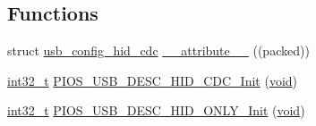 \subsection*{Functions}
\begin{DoxyCompactItemize}
\item 
struct \hyperlink{structusb__config__hid__cdc}{usb\-\_\-config\-\_\-hid\-\_\-cdc} \hyperlink{group___p_i_o_s___u_s_b___d_e_s_c_ga6fb0c6d6cc5e1170eef958ceaf306a50}{\-\_\-\-\_\-attribute\-\_\-\-\_\-} ((packed))
\item 
\hyperlink{group___n_a_m_e_gafd12020da5a235dfcf0c3c748fb5baed}{int32\-\_\-t} \hyperlink{group___p_i_o_s___u_s_b___d_e_s_c_ga15a9a7a662d2bce8263b132b33753d75}{P\-I\-O\-S\-\_\-\-U\-S\-B\-\_\-\-D\-E\-S\-C\-\_\-\-H\-I\-D\-\_\-\-C\-D\-C\-\_\-\-Init} (\hyperlink{group___n_a_m_e_ga18028b8badbf1ea7e704ccac3c488e82}{void})
\item 
\hyperlink{group___n_a_m_e_gafd12020da5a235dfcf0c3c748fb5baed}{int32\-\_\-t} \hyperlink{group___p_i_o_s___u_s_b___d_e_s_c_ga92ea05b354edae76dd1315a1e389d506}{P\-I\-O\-S\-\_\-\-U\-S\-B\-\_\-\-D\-E\-S\-C\-\_\-\-H\-I\-D\-\_\-\-O\-N\-L\-Y\-\_\-\-Init} (\hyperlink{group___n_a_m_e_ga18028b8badbf1ea7e704ccac3c488e82}{void})
\end{DoxyCompactItemize}
